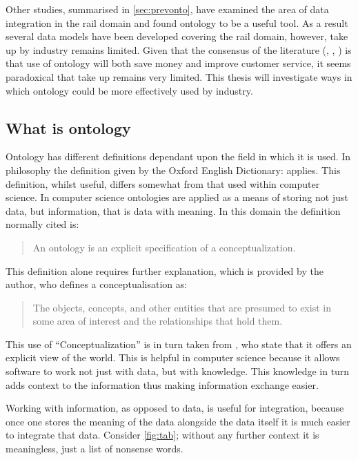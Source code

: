 Other studies, summarised in \autoref{sec:prevonto}, have examined the area of data integration in the rail domain and found ontology to be a useful tool. As a result several data models have been developed covering the rail domain, however, take up by industry remains limited. Given that the consensus of the literature (\citep{Kopf2010}, \citep{Gogos2016}, \citep{Verstichel2015} ) is that use of ontology will both save money and improve customer service, it seems paradoxical that take up remains very limited. This thesis will investigate ways in which ontology could be more effectively used by industry.

\subsection{What is ontology}

Ontology has different definitions dependant upon the field in which it is used. In philosophy the definition given by the Oxford English Dictionary:  applies. This definition, whilst useful, differs somewhat from that used within computer science. In computer science ontologies are applied as a means of storing not just data, but information, that is data with meaning. In this domain the definition normally cited is:

\begin{quote}
An ontology is an explicit specification of a conceptualization. 
\end{quote}
\citet{gruber1993translation} 

 This definition alone requires further explanation, which is provided by the author, who defines a conceptualisation as: 
\begin{quote}
	The objects, concepts, and other entities that are presumed to exist in some area of interest and the relationships that hold them.
\end{quote}

 This use of ``Conceptualization'' is in turn taken from \citet{Genesereth1987}, who state that it offers an explicit view of the world. This is helpful in computer science because it allows software to work not just with data, but with knowledge. This knowledge in turn adds context to the information thus making information exchange easier.


Working with information, as opposed to data, is useful for integration, because once one stores the meaning of the data alongside the data itself it is much easier to integrate that data. Consider \autoref{fig:tab}; without any further context it is meaningless, just a list of nonsense words.

